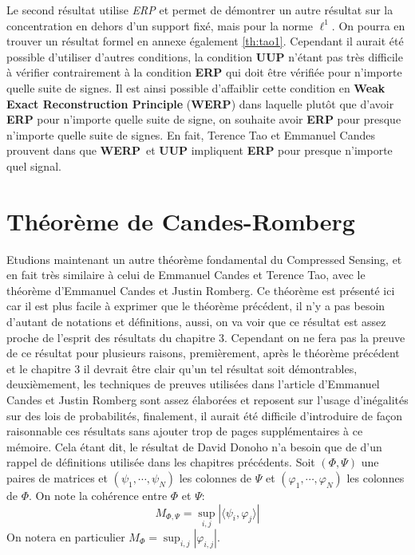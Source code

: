 \newline
Le second résultat utilise \emph{ERP} et permet de démontrer un autre résultat sur la concentration en dehors d'un support fixé, mais pour la norme $\ell^1$. On pourra en trouver un résultat formel en annexe également \ref{th:tao1}.
\newline
Cependant il aurait été possible d'utiliser d'autres conditions, la condition \textbf{UUP} n'étant pas très difficile à vérifier contrairement à la condition \textbf{ERP} qui doit être vérifiée pour n'importe quelle suite de signes. 
Il est ainsi possible d'affaiblir cette condition en \textbf{Weak Exact Reconstruction Principle} (\textbf{WERP}) dans laquelle plutôt que d'avoir \textbf{ERP} pour n'importe quelle suite de signe, on souhaite avoir \textbf{ERP} pour presque n'importe quelle suite de signes. 
En fait, Terence Tao et Emmanuel Candes prouvent dans \cite{CT} que \textbf{WERP} et \textbf{UUP} impliquent \textbf{ERP} pour presque n'importe quel signal.
\section{Théorème de Candes-Romberg}
Etudions maintenant un autre théorème fondamental du Compressed Sensing, et en fait très similaire à celui de Emmanuel Candes et Terence Tao, avec le théorème d'Emmanuel Candes et Justin Romberg.
Ce théorème est présenté ici car il est plus facile à exprimer que le théorème précédent, il n'y a pas besoin d'autant de notations et définitions, aussi, on va voir que ce résultat est assez proche de l'esprit des résultats du chapitre 3.
Cependant on ne fera pas la preuve de ce résultat pour plusieurs raisons, premièrement, après le théorème précédent et le chapitre 3 il devrait être clair qu'un tel résultat soit démontrables, deuxièmement, les techniques de preuves utilisées dans l'article d'Emmanuel Candes et Justin Romberg \cite{CR} sont assez élaborées et reposent sur l'usage d'inégalités sur des lois de probabilités, finalement, il aurait été difficile d'introduire de façon raisonnable ces résultats sans ajouter trop de pages supplémentaires à ce mémoire.
\newline
Cela étant dit, le résultat de David Donoho n'a besoin que de d'un rappel de définitions utilisée dans les chapitres précédents.
Soit $(\Phi, \Psi)$ une paires de matrices et $(\psi_1, \cdots, \psi_N)$ les colonnes de $\Psi$ et $(\varphi_1, \cdots, \varphi_N)$ les colonnes de $\Phi$.
On note la cohérence entre $\Phi$ et $\Psi$:
\begin{equation}
	M_{\Phi, \Psi} = \sup_{i,j}|\langle \psi_i, \varphi_j \rangle|
\end{equation}
On notera en particulier $M_\Phi = \sup_{i,j} |\varphi_{i,j}|$.

